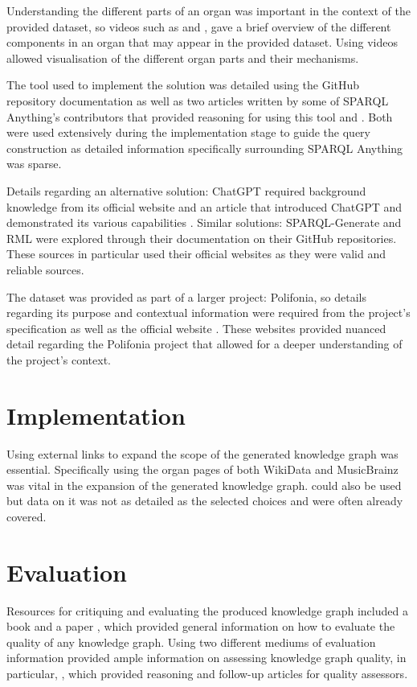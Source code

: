 Understanding the different parts of an organ was important in the context of the provided dataset, so videos such as \cite{organvideo} and \cite{organvideo1}, gave a brief overview of the different components in an organ that may appear in the provided dataset. Using videos allowed visualisation of the different organ parts and their mechanisms.   

The tool used to implement the solution was detailed using the GitHub repository documentation \cite{sparqlanythinggithub} as well as two articles written by some of SPARQL Anything's contributors that provided reasoning for using this tool \cite{sparqlanything} and \cite{asprino2023knowledge}. Both were used extensively during the implementation stage to guide the query construction as detailed information specifically surrounding SPARQL Anything was sparse. 

Details regarding an alternative solution: ChatGPT required background knowledge from its official website \cite{chatgptwebsite} and an article that introduced ChatGPT and demonstrated its various capabilities \cite{chatgpt}. Similar solutions: SPARQL-Generate \cite{sparqlgenerate} and RML \cite{rml} were explored through their documentation on their GitHub repositories. These sources in particular used their official websites as they were valid and reliable sources. 

The dataset was provided as part of a larger project: Polifonia, so details regarding its purpose and contextual information were required from the project's specification \cite{polifoniaproject} as well as the official website \cite{polifonia}. These websites provided nuanced detail regarding the Polifonia project that allowed for a deeper understanding of the project's context. 

\section{Implementation}
\hspace{0.5cm} Using external links to expand the scope of the generated knowledge graph was essential. Specifically using the organ pages of both WikiData \cite{organwikidata} and MusicBrainz \cite{organmusicbrainz} was vital in the expansion of the generated knowledge graph. \cite{organdbpedia} could also be used but data on it was not as detailed as the selected choices and were often already covered.

\section{Evaluation}
\hspace{0.5cm} Resources for critiquing and evaluating the produced knowledge graph included a book \cite{knowledgegraphevaulationbook} and a paper \cite{evaluationpaper}, which provided general information on how to evaluate the quality of any knowledge graph. Using two different mediums of evaluation information provided ample information on assessing knowledge graph quality, in particular, \cite{evaluationpaper}, which provided reasoning and follow-up articles for quality assessors. 

